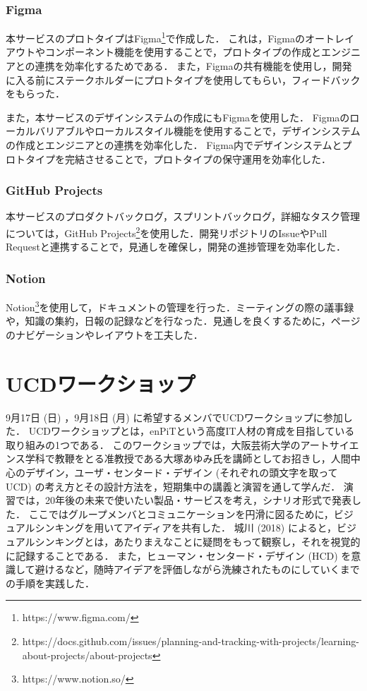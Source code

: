 \subsubsection{Figma}
本サービスのプロトタイプはFigma\footnote{https://www.figma.com/}で作成した．
これは，Figmaのオートレイアウトやコンポーネント機能を使用することで，プロトタイプの作成とエンジニアとの連携を効率化するためである．
また，Figmaの共有機能を使用し，開発に入る前にステークホルダーにプロトタイプを使用してもらい，フィードバックをもらった．

また，本サービスのデザインシステムの作成にもFigmaを使用した．
Figmaのローカルバリアブルやローカルスタイル機能を使用することで，デザインシステムの作成とエンジニアとの連携を効率化した．
Figma内でデザインシステムとプロトタイプを完結させることで，プロトタイプの保守運用を効率化した．

\subsubsection{GitHub Projects}
本サービスのプロダクトバックログ，スプリントバックログ，詳細なタスク管理については，GitHub Projects\footnote{https://docs.github.com/issues/planning-and-tracking-with-projects/learning-about-projects/about-projects}を使用した．開発リポジトリのIssueやPull Requestと連携することで，見通しを確保し，開発の進捗管理を効率化した．

\subsubsection{Notion}
Notion\footnote{https://www.notion.so/}を使用して，ドキュメントの管理を行った．ミーティングの際の議事録や，知識の集約，日報の記録などを行なった．見通しを良くするために，ページのナビゲーションやレイアウトを工夫した．

\section{UCDワークショップ}
9月17日 (日) ，9月18日 (月) に希望するメンバでUCDワークショップに参加した．
UCDワークショップとは，enPiTという高度IT人材の育成を目指している取り組みの1つである．
このワークショップでは，大阪芸術大学のアートサイエンス学科で教鞭をとる准教授である大塚あゆみ氏を講師としてお招きし，人間中心のデザイン，ユーザ・センタード・デザイン (それぞれの頭文字を取ってUCD) の考え方とその設計方法を，短期集中の講義と演習を通して学んだ．
演習では，20年後の未来で使いたい製品・サービスを考え，シナリオ形式で発表した．
ここではグループメンバとコミュニケーションを円滑に図るために，ビジュアルシンキングを用いてアイディアを共有した．
城川 (2018) によると，ビジュアルシンキングとは，あたりまえなことに疑問をもって観察し，それを視覚的に記録することである\cite{visual}．
また，ヒューマン・センタード・デザイン (HCD) を意識して避けるなど，随時アイデアを評価しながら洗練されたものにしていくまでの手順を実践した．

